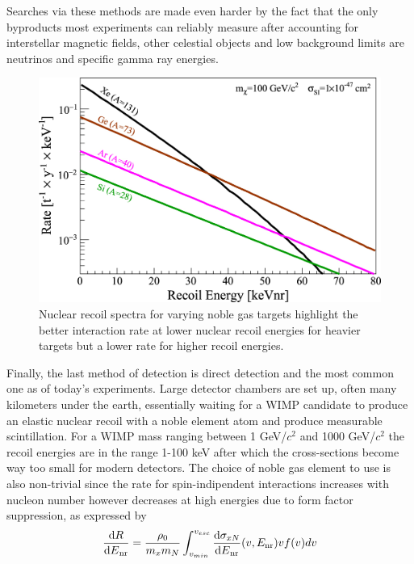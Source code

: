 \documentclass[11pt]{article} %
\begin{document}
Searches via these methods are made even harder by the fact that the only byproducts most experiments can reliably measure after accounting
for interstellar magnetic fields, other celestial objects and low background limits are neutrinos and specific gamma ray energies.
\\
\begin{figure}[H]
\centering
\includegraphics[scale=1]{images/recoil_spectra.jpg}
\caption{\cite{Schumann_2019} Nuclear recoil spectra for varying noble gas targets highlight the better interaction
rate at lower nuclear recoil energies for heavier targets but a lower rate for higher recoil energies.}
\label{fig:recoil_spectra}
\end{figure}
\par Finally, the last method of detection is direct detection \cite{gaitskell2004direct} and the most common one as of today's experiments.
Large detector chambers are set up, often many kilometers under the earth, essentially waiting for a WIMP
candidate to produce an elastic nuclear recoil with a noble element atom and produce measurable scintillation.
For a WIMP mass ranging between 1 GeV/$c^2$ and 1000 GeV/$c^2$ the recoil energies are in the range 1-100 keV
after which the cross-sections become way too small for modern detectors.
The choice of noble gas element to use is also non-trivial since the rate for spin-indipendent interactions increases with
nucleon number however decreases at high energies due to form factor suppression, as expressed by \cite{goodman1985detectability}
\begin{equation}
\frac{{\rm{d}}{R}}{{{\rm{d}}{E}}_{\mathrm{nr}}} = \frac{\rho_0}{m_x m_N} \int_{v_{min}}^{v_{esc}}\frac{{\rm{d}}{\sigma_{x N}}}{{{\rm{d}}{E}}_{\mathrm{nr}}}(v,E_{\mathrm{nr}}) v f(v) dv
\label{eq:dm}
\end{equation}
\end{document}
